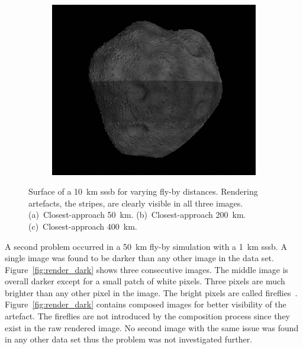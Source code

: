 \begin{figure}[htb]
\begin{subfigure}[b]{0.32\textwidth}
        \caption{}
        \label{fig:render_artefacts_200}
    \end{subfigure}
    \begin{subfigure}[b]{0.32\textwidth}
        \centering
        \includegraphics[width=\textwidth]{doc/thesis/0_figures/rendering_artefacts/400_10_SssbOnly_2017-08-15T115845-190000.jpg}
        \caption{}
        \label{fig:render_artefacts_400}
    \end{subfigure}
    \caption{Surface of a \SI{10}{\kilo\meter} \gls{sssb} for varying fly-by distances. Rendering artefacts, the stripes, are clearly visible in all three images. (a)~Closest-approach \SI{50}{\kilo\meter}. (b)~Closest-approach \SI{200}{\kilo\meter}. (c)~Closest-approach \SI{400}{\kilo\meter}.}
    \label{fig:render_artefacts}
\end{figure}

A second problem occurred in a \SI{50}{\kilo\meter} fly-by simulation with a \SI{1}{\kilo\meter} \gls{sssb}. A single image was found to be darker than any other image in the data set. Figure~\ref{fig:render_dark} shows three consecutive images. The middle image is overall darker except for a small patch of white pixels. Three pixels are much brighter than any other pixel in the image. The bright pixels are called fireflies~\cite{Valenza2015BlenderCookbook}. Figure~\ref{fig:render_dark} contains composed images for better visibility of the artefact. The fireflies are not introduced by the composition process since they exist in the raw rendered image. No second image with the same issue was found in any other data set thus the problem was not investigated further.

